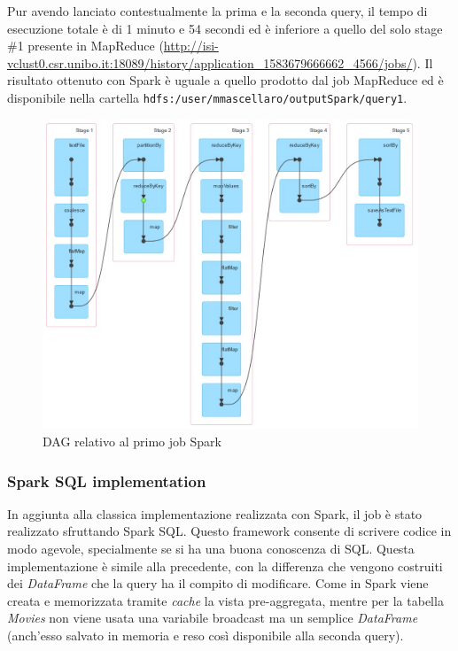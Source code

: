 \documentclass[10pt]{article}
\begin{document}
Pur avendo lanciato contestualmente la prima e la seconda query, il tempo di esecuzione totale è di 1 minuto e 54 secondi ed è inferiore a quello del solo stage \#1 presente in MapReduce (\url{http://isi-vclust0.csr.unibo.it:18089/history/application_1583679666662_4566/jobs/}). Il risultato ottenuto con Spark è uguale a quello prodotto dal job MapReduce ed è disponibile nella cartella \texttt{hdfs:/user/mmascellaro/outputSpark/query1}.

\begin{figure}[th]
	\centering
	\includegraphics[scale=0.54]{images/DagSpark1.jpg}
	\caption{DAG relativo al primo job Spark}
\end{figure}

\subsubsection{Spark SQL implementation}

In aggiunta alla classica implementazione realizzata con Spark, il job è stato realizzato sfruttando Spark SQL. Questo framework consente di scrivere codice in modo agevole, specialmente se si ha una buona conoscenza di SQL. Questa implementazione è simile alla precedente, con la differenza che vengono costruiti dei \textit{DataFrame} che la query ha il compito di modificare. Come in Spark viene creata e memorizzata tramite \textit{cache} la vista pre-aggregata, mentre per la tabella \textit{Movies} non viene usata una variabile broadcast ma un semplice \textit{DataFrame} (anch'esso salvato in memoria e reso così disponibile alla seconda query).
\end{document}
